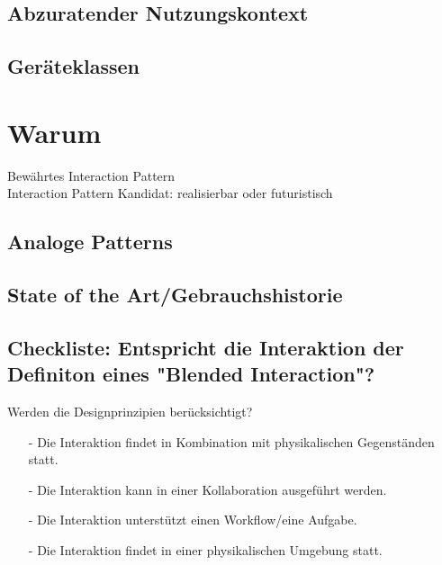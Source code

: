 \subsection*{Abzuratender Nutzungskontext}
\notvalidcontext

\subsection*{Geräteklassen}
\devicetabular


\section*{Warum}

\checkbox{\established} Bewährtes Interaction Pattern \\
\checkbox{\candidate} Interaction Pattern Kandidat: 
\checkbox{\realizable} realisierbar oder
\checkbox{\futuristic} futuristisch 

\subsection*{Analoge Patterns}
\otherpatterns

\subsection*{State of the Art/Gebrauchshistorie}
\stateoftheart

\subsection*{Checkliste: Entspricht die Interaktion der Definiton eines "Blended Interaction"?}
\checkbox{\designprinciples} Werden die Designprinzipien berücksichtigt?
\begin{itemize}
\item[-] Die Interaktion findet in Kombination mit physikalischen Gegenständen statt.
\item[-] Die Interaktion kann in einer Kollaboration ausgeführt werden.
\item[-] Die Interaktion unterstützt einen Workflow/eine Aufgabe.
\item[-] Die Interaktion findet in einer physikalischen Umgebung statt.
\end{itemize} 

